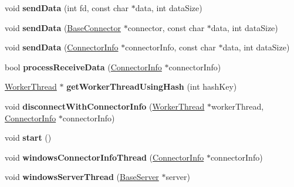 \begin{DoxyCompactItemize}
void {\bfseries send\+Data} (int fd, const char $\ast$data, int data\+Size)
\item 
\mbox{\label{class_c_g_1_1_network_aac7198d5ba6e0add2257e0da3943f756}} 
void {\bfseries send\+Data} (\mbox{\hyperlink{class_c_g_1_1_base_connector}{Base\+Connector}} $\ast$connector, const char $\ast$data, int data\+Size)
\item 
\mbox{\label{class_c_g_1_1_network_aeafac10483418b385c2e183c8516610e}} 
void {\bfseries send\+Data} (\mbox{\hyperlink{class_c_g_1_1_connector_info}{Connector\+Info}} $\ast$connector\+Info, const char $\ast$data, int data\+Size)
\item 
\mbox{\label{class_c_g_1_1_network_ac13d409479954945a69ae573ac89d639}} 
bool {\bfseries process\+Receive\+Data} (\mbox{\hyperlink{class_c_g_1_1_connector_info}{Connector\+Info}} $\ast$connector\+Info)
\item 
\mbox{\label{class_c_g_1_1_network_a40e2c5ec8e896caa93fd5ca30fe8d837}} 
\mbox{\hyperlink{class_c_g_1_1_worker_thread}{Worker\+Thread}} $\ast$ {\bfseries get\+Worker\+Thread\+Using\+Hash} (int hash\+Key)
\item 
\mbox{\label{class_c_g_1_1_network_a5366aa30553b7e4f92fc936301448eec}} 
void {\bfseries disconnect\+With\+Connector\+Info} (\mbox{\hyperlink{class_c_g_1_1_worker_thread}{Worker\+Thread}} $\ast$worker\+Thread, \mbox{\hyperlink{class_c_g_1_1_connector_info}{Connector\+Info}} $\ast$connector\+Info)
\item 
\mbox{\label{class_c_g_1_1_network_add107d404897c8f29669fd1210ebec17}} 
void {\bfseries start} ()
\item 
\mbox{\label{class_c_g_1_1_network_a8ef3e5635ff4eb5a1e75d02e82b6bc3f}} 
void {\bfseries windows\+Connector\+Info\+Thread} (\mbox{\hyperlink{class_c_g_1_1_connector_info}{Connector\+Info}} $\ast$connector\+Info)
\item 
\mbox{\label{class_c_g_1_1_network_a54d8280ebfdb0b0956a81b21f3ea30a4}} 
void {\bfseries windows\+Server\+Thread} (\mbox{\hyperlink{class_c_g_1_1_base_server}{Base\+Server}} $\ast$server)
\end{DoxyCompactItemize}
